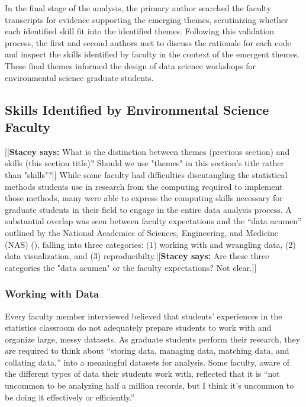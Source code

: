\documentclass[12pt]{article}
\newcommand{\stacey}[1]{{\color{purple}[[\textbf{Stacey says: }#1]]}}
\begin{document}
\quad In the final stage of the analysis, the primary author searched the 
faculty transcripts for evidence supporting the emerging themes, scrutinizing 
whether each identified skill fit into the identified themes. Following this 
validation process, the first and second authors met to discuss the rationale
for each code and inspect the skills identified by faculty in the context of the
emergent themes. These final themes informed the design of data 
science workshops for environmental science graduate students. 

\subsection{Skills Identified by Environmental Science Faculty}

\stacey{What is the distinction between themes (previous section) and skills (this section title)? Should we use "themes" in this section's title rather than "skills"?}
\quad While some faculty had difficulties disentangling the statistical methods
students use in research from the computing required to implement those methods,
many were able to express the computing skills necessary for graduate students
in their field to engage in the entire data analysis process. A substantial
overlap was seen between faculty expectations and the ``data acumen'' outlined
by the National Academies of Sciences, Engineering, and Medicine (NAS) (\citeyear{nas}), falling into three categories: (1) working with and
wrangling data, (2) data visualization, and (3) reproducibilty.\stacey{Are these three
categories the "data acumen" or the faculty expectations? Not clear.}

\subsubsection{Working with Data}  

\quad Every faculty member interviewed believed that students' experiences in the
statistics classroom do not adequately prepare students to work with and
organize large, messy datasets. As graduate students perform their research,
they are required to think about ``storing data, managing data, matching
data, and collating data,'' into a meaningful datasets for analysis. Some 
faculty, aware of the different types of data their students work with, 
reflected that it is ``not uncommon to be analyzing half a million records, but
I think it's uncommon to be doing it effectively or efficiently.'' 
\end{document}
